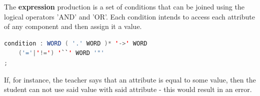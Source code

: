 %


The \textbf{expression} production is a set of conditions that can be joined using the logical operators 'AND' and 'OR'. Each condition intends to access each attribute of any component and then assign it a value.

\begin{center}
\begin{minipage}{10cm}
\begin{lstlisting}[language=java, basicstyle=\small, label={lst:dsl_cond_prod}, caption=DSL condition production]
condition : WORD ( '.' WORD )* '->' WORD 
    ('='|'!=') '``' WORD '"'
;
\end{lstlisting}
\end{minipage}
\end{center}



If, for instance, the teacher says that an attribute is equal to some value, then the student can not use said value with said attribute - this would result in an error.

